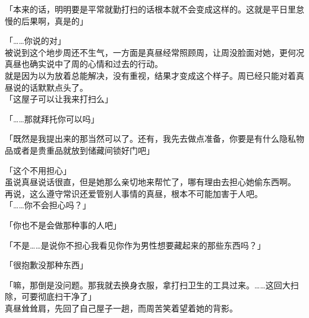 「本来的话，明明要是平常就勤打扫的话根本就不会变成这样的。这就是平日里怠慢的后果啊，真是的」

「……你说的对」\\

被说到这个地步周还不生气，一方面是真昼经常照顾周，让周没脸面对她，更何况真昼也确实说中了周的心情和过去的行动。\\

就是因为以为放着总能解决，没有重视，结果才变成这个样子。周已经只能对着真昼说的话默默点头了。\\

「这屋子可以让我来打扫么」

「……那就拜托你可以吗」

「既然是我提出来的那当然可以了。还有，我先去做点准备，你要是有什么隐私物品或者是贵重品就放到储藏间锁好门吧」

「这个不用担心」\\

虽说真昼说话很直，但是她那么亲切地来帮忙了，哪有理由去担心她偷东西啊。\\

再说，这么遵守常识还爱管别人事情的真昼，根本不可能加害于人吧。\\

「……你不会担心吗？」

「你也不是会做那种事的人吧」

「不是……是说你不担心我看见你作为男性想要藏起来的那些东西吗？」

「很抱歉没那种东西」

「嘛，那倒是没问题。那我就去换身衣服，拿打扫卫生的工具过来。……这回大扫除，可要彻底扫干净了」\\

真昼耸耸肩，先回了自己屋子一趟，而周苦笑着望着她的背影。
